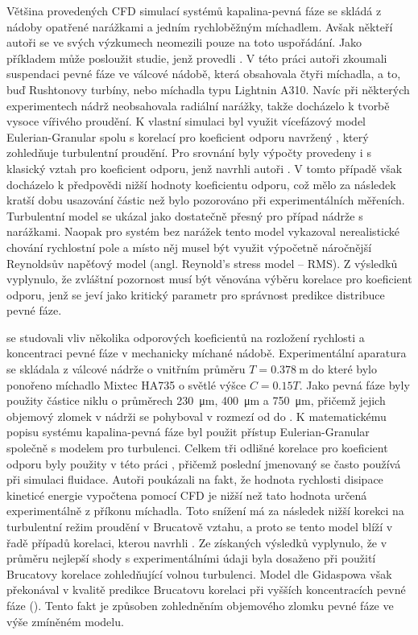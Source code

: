 Většina provedených CFD simulací systémů kapalina-pevná fáze se skládá z nádoby opatřené narážkami a jedním rychloběžným míchadlem. Avšak někteří autoři se ve svých výzkumech neomezili pouze na toto uspořádání. Jako příkladem může posloužit studie, jenž provedli \citet{mon04}. V této práci autoři zkoumali suspendaci pevné fáze ve válcové nádobě, která obsahovala čtyři míchadla, a to, buď Rushtonovy turbíny, nebo míchadla typu Lightnin A310. Navíc při některých experimentech nádrž neobsahovala radiální narážky, takže docházelo k tvorbě vysoce vířivého proudění. K vlastní simulaci byl využit vícefázový model Eulerian-Granular spolu s korelací pro koeficient odporu navržený \citet{pin01}, který zohledňuje turbulentní proudění. Pro srovnání byly výpočty provedeny i s klasický vztah pro koeficient odporu, jenž navrhli autoři \citet{schi32}. V tomto případě však docházelo k předpovědi nižší hodnoty koeficientu odporu, což mělo za následek kratší dobu usazování částic než bylo pozorováno při experimentálních měřeních. Turbulentní model \keps{} se ukázal jako dostatečně přesný pro případ nádrže s narážkami. Naopak pro systém bez narážek tento model vykazoval nerealistické chování rychlostní pole a místo něj musel být využit výpočetně náročnější Reynoldsův napěťový model (angl. Reynold's stress model -- RMS). Z výsledků vyplynulo, že zvláštní pozornost musí být věnována výběru korelace pro koeficient odporu, jenž se jeví jako kritický parametr pro správnost predikce distribuce pevné fáze.

\citet{ochi08} se studovali vliv několika odporových koeficientů na rozložení rychlosti a koncentraci pevné fáze v mechanicky míchané nádobě. Experimentální aparatura se skládala z válcové nádrže o vnitřním průměru $T=\SI{0.378}{\meter}$ do které bylo ponořeno míchadlo Mixtec HA735 o světlé výšce $C=\num{0.15}T$. Jako pevná fáze byly použity částice niklu o průměrech \SI{230}{\micro\meter}, \SI{400}{\micro\meter} a \SI{750}{\micro\meter}, přičemž jejich objemový zlomek v nádrži se pohyboval v rozmezí od  do . K matematickému popisu systému kapalina-pevná fáze byl použit přístup Eulerian-Granular společně s modelem \keps{} pro turbulenci. Celkem tři odlišné korelace pro koeficient odporu byly použity v této práci \citep{schi32, bru98, gid94}, přičemž poslední jmenovaný se často používá při simulaci fluidace. Autoři poukázali na fakt, že hodnota rychlosti disipace kineticé energie vypočtena pomocí CFD je nižší než tato hodnota určená experimentálně z příkonu míchadla. Toto snížení má za následek nižší korekci na turbulentní režim proudění v Brucatově vztahu, a proto se tento model blíží v řadě případů korelaci, kterou navrhli \citet{schi32}. Ze získaných výsledků vyplynulo, že v průměru nejlepší shody s experimentálními údaji byla dosaženo při použití Brucatovy korelace zohledňující volnou turbulenci. Model dle Gidaspowa však překonával v kvalitě predikce Brucatovu korelaci při vyšších koncentracích pevné fáze (). Tento fakt je způsoben zohledněním objemového zlomku pevné fáze ve výše zmíněném modelu.

